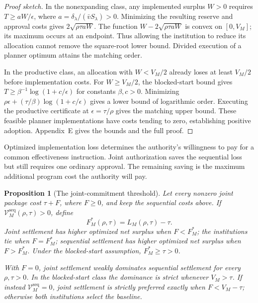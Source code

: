 \documentclass[ecta,draft]{econsocart}
\newtheorem{proposition}[theorem]{Proposition}
\theoremstyle{definition}
\theoremstyle{definition}
\begin{document}
\begin{proof}[Proof sketch]
In the nonexpanding class, any implemented surplus $W>0$ requires
$T\geq aW/\epsilon$, where
$a=\delta_\lambda/(\bar vS_\lambda)>0$. Minimizing the resulting
reserve and approval costs gives $2\sqrt{\rho\tau aW}$.
The function $W-2\sqrt{\rho\tau aW}$ is convex on $[0,V_M]$;
its maximum occurs at an endpoint. Thus allowing the institution to
reduce its allocation cannot remove the square-root lower bound.
Divided execution of a planner optimum attains the matching order.

In the productive class, an allocation with $W<V_M/2$ already loses
at least $V_M/2$ before implementation costs. For $W\geq V_M/2$,
the blocked-start bound gives
$T\geq\beta^{-1}\log(1+c/\epsilon)$ for constants
$\beta,c>0$. Minimizing
$\rho\epsilon+(\tau/\beta)\log(1+c/\epsilon)$ gives a lower
bound of logarithmic order. Executing the productive certificate at
$\epsilon=\tau/\rho$ gives the matching upper bound. These feasible
planner implementations have costs tending to zero, establishing
positive adoption. Appendix~E%
 gives the bounds
and the full proof.
\end{proof}

Optimized implementation loss determines the authority's willingness to pay
for a common effectiveness instruction. Joint authorization saves the
sequential loss but still requires one ordinary approval. The remaining
saving is the maximum additional program cost the authority will pay.

\begin{proposition}[The joint-commitment threshold]
\label{prop:feethreshold}
Let every nonzero joint package cost $\tau+F$, where $F\geq0$,
and keep the sequential costs above. If
$\mathcal V_M^{\mathrm{seq}}(\rho,\tau)>0$, define
\[
 F_M^*(\rho,\tau)=L_M(\rho,\tau)-\tau.
\]
Joint settlement has higher optimized net surplus when $F<F_M^*$;
the institutions tie when $F=F_M^*$; sequential settlement has higher
optimized net surplus when $F>F_M^*$. Under the blocked-start assumption,
$F_M^*\geq\tau>0$.

With $F=0$, joint settlement weakly dominates sequential settlement
for every $\rho,\tau>0$. In the blocked-start class the dominance is
strict whenever $V_M>\tau$. If instead
$\mathcal V_M^{\mathrm{seq}}=0$, joint settlement is strictly preferred
exactly when $F<V_M-\tau$; otherwise both institutions select the baseline.
\end{proposition}
\end{document}
